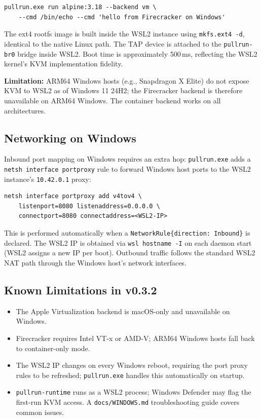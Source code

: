 \documentclass[11pt,a4paper]{article}
\begin{document}
\begin{verbatim}
pullrun.exe run alpine:3.18 --backend vm \
    --cmd /bin/echo --cmd 'hello from Firecracker on Windows'
\end{verbatim}

The ext4 rootfs image is built inside the WSL2 instance using \texttt{mkfs.ext4 -d}, identical to the native Linux path. The TAP device is attached to the \texttt{pullrun-br0} bridge inside WSL2. Boot time is approximately 500\,ms, reflecting the WSL2 kernel's KVM implementation fidelity.

\textbf{Limitation:} ARM64 Windows hosts (e.g., Snapdragon X Elite) do not expose KVM to WSL2 as of Windows 11 24H2; the Firecracker backend is therefore unavailable on ARM64 Windows. The container backend works on all architectures.

\subsection{Networking on Windows}

Inbound port mapping on Windows requires an extra hop: \texttt{pullrun.exe} adds a \texttt{netsh interface portproxy} rule to forward Windows host ports to the WSL2 instance's \texttt{10.42.0.1} proxy:

\begin{verbatim}
netsh interface portproxy add v4tov4 \
    listenport=8080 listenaddress=0.0.0.0 \
    connectport=8080 connectaddress=<WSL2-IP>
\end{verbatim}

This is performed automatically when a \texttt{NetworkRule\{direction: Inbound\}} is declared. The WSL2 IP is obtained via \texttt{wsl hostname -I} on each daemon start (WSL2 assigns a new IP per boot). Outbound traffic follows the standard WSL2 NAT path through the Windows host's network interfaces.

\subsection{Known Limitations in v0.3.2}

\begin{itemize}[leftmargin=*]
    \item The Apple Virtualization backend is macOS-only and unavailable on Windows.
    \item Firecracker requires Intel VT-x or AMD-V; ARM64 Windows hosts fall back to container-only mode.
    \item The WSL2 IP changes on every Windows reboot, requiring the port proxy rules to be refreshed; \texttt{pullrun.exe} handles this automatically on startup.
    \item \texttt{pullrun-runtime} runs as a WSL2 process; Windows Defender may flag the first-run KVM access. A \texttt{docs/WINDOWS.md} troubleshooting guide covers common issues.
\end{itemize}
\end{document}
